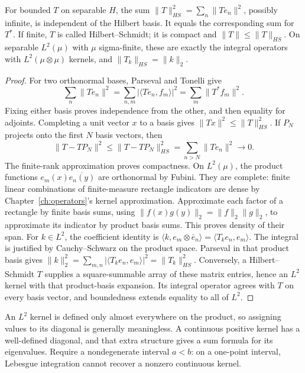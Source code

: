 \begin{proposition}\label{prop:hs}
For bounded $T$ on separable $H$, the sum $\|T\|_{HS}^2=\sum_n\|Te_n\|^2$, possibly infinite, is independent of the Hilbert basis. It equals the corresponding sum for $T^*$. If finite, $T$ is called Hilbert--Schmidt; it is compact and $\|T\|\le\|T\|_{HS}$.
On separable $L^2(\mu)$ with $\mu$ sigma-finite, these are exactly the integral operators with $L^2(\mu\otimes\mu)$ kernels, and $\|T_k\|_{HS}=\|k\|_2$.
\end{proposition}
\begin{proof}
For two orthonormal bases, Parseval and Tonelli give
\[
\sum_n\|Te_n\|^2=\sum_{n,m}|\langle Te_n,f_m\rangle|^2
=\sum_m\|T^*f_m\|^2.
\]
Fixing either basis proves independence from the other, and then equality for adjoints. Completing a unit vector $x$ to a basis gives $\|Tx\|^2\le\|T\|_{HS}^2$. If $P_N$ projects onto the first $N$ basis vectors, then
\[
\|T-TP_N\|^2\le\|T-TP_N\|_{HS}^2
=\sum_{n>N}\|Te_n\|^2\longrightarrow0.
\]
The finite-rank approximation proves compactness.
On $L^2(\mu)$, the product functions $e_m(x)\overline{e_n(y)}$ are orthonormal by Fubini. They are complete: finite linear combinations of finite-measure rectangle indicators are dense by Chapter~\ref{ch:operators}'s kernel approximation. Approximate each factor of a rectangle by finite basis sums, using $\|f(x)g(y)\|_2=\|f\|_2\|g\|_2$, to approximate its indicator by product basis sums. This proves density of their span.
For $k\in L^2$, the coefficient identity is
$\langle k,e_m\otimes\bar e_n\rangle=\langle T_ke_n,e_m\rangle$.
The integral is justified by Cauchy--Schwarz on the product space. Parseval in that product basis gives $\|k\|_2^2=\sum_{m,n}|\langle T_ke_n,e_m\rangle|^2=\|T_k\|_{HS}^2$. Conversely, a Hilbert--Schmidt $T$ supplies a square-summable array of these matrix entries, hence an $L^2$ kernel with that product-basis expansion. Its integral operator agrees with $T$ on every basis vector, and boundedness extends equality to all of $L^2$.
\end{proof}

An $L^2$ kernel is defined only almost everywhere on the product, so assigning values to its diagonal is generally meaningless. A continuous positive kernel has a well-defined diagonal, and that extra structure gives a sum formula for its eigenvalues. Require a nondegenerate interval $a<b$: on a one-point interval, Lebesgue integration cannot recover a nonzero continuous kernel.


